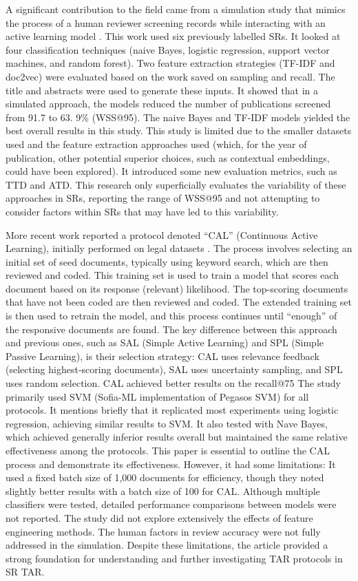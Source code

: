 \documentclass[../main.tex]{subfiles}
\begin{document}
A significant contribution to the field came from a simulation study that mimics the process of a human reviewer screening records while interacting with an active learning model \cite{ferdinands_performance_2023}. This work used six previously labelled SRs. It looked at four classification techniques (naive Bayes, logistic regression, support vector machines, and random forest). Two feature extraction strategies (TF-IDF and doc2vec) were evaluated based on the work saved on sampling and recall. The title and abstracts were used to generate these inputs. It showed that in a simulated approach, the models reduced the number of publications screened from 91.7 to 63. 9\% (WSS@95). The naive Bayes and TF-IDF models yielded the best overall results in this study. This study is limited due to the smaller datasets used and the feature extraction approaches used (which, for the year of publication, other potential superior choices, such as contextual embeddings, could have been explored). It introduced some new evaluation metrics, such as TTD and ATD. This research only superficially evaluates the variability of these approaches in SRs, reporting the range of WSS@95 and not attempting to consider factors within SRs that may have led to this variability. 

More recent work reported a protocol denoted ``CAL'' (Continuous Active Learning), initially performed on legal datasets \cite{cormack_evaluation_2014}. The process involves selecting an initial set of seed documents, typically using keyword search, which are then reviewed and coded. This training set is used to train a model that scores each document based on its response (relevant) likelihood. The top-scoring documents that have not been coded are then reviewed and coded. The extended training set is then used to retrain the model, and this process continues until ``enough'' of the responsive documents are found.
The key difference between this approach and previous ones, such as SAL (Simple Active Learning) and SPL (Simple Passive Learning), is their selection strategy: CAL uses relevance feedback (selecting highest-scoring documents), SAL uses uncertainty sampling, and SPL uses random selection. CAL achieved better results on the recall@75 %
The study primarily used SVM (Sofia-ML implementation of Pegasos SVM) for all protocols. It mentions briefly that it replicated most experiments using logistic regression, achieving similar results to SVM. It also tested with Nave Bayes, which achieved generally inferior results overall but maintained the same relative effectiveness among the protocols.
This paper is essential to outline the CAL process and demonstrate its effectiveness. However, it had some limitations: It used a fixed batch size of 1,000 documents for efficiency, though they noted slightly better results with a batch size of 100 for CAL. Although multiple classifiers were tested, detailed performance comparisons between models were not reported. The study did not explore extensively the effects of feature engineering methods. The human factors in review accuracy were not fully addressed in the simulation. Despite these limitations, the article provided a strong foundation for understanding and further investigating TAR protocols in SR TAR.
\end{document}
